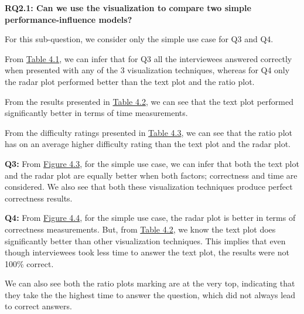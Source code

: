 \vskip 0.2in
\begin{mdframed}
\textbf{RQ2.1: Can we use the visualization to compare two simple performance-influence models?}
\end{mdframed}

For this sub-question, we consider only the simple use case for Q3 and Q4.

\begin{description}[leftmargin=0pt]
\item[Correctness: ] From \hyperref[table:correctness]{Table 4.1}, we can infer that for Q3 all the interviewees answered correctly when presented with any of the 3 visualization techniques, whereas for Q4 only the radar plot performed better than the text plot and the ratio plot.

\item[Time Measurements: ] From the results presented in \hyperref[table:time]{Table 4.2}, we can see that the text plot performed significantly better in terms of time measurements.

\item[Difficulty Ratings: ] From the difficulty ratings presented in \hyperref[table:rating]{Table 4.3}, we can see that the ratio plot has on an average higher difficulty rating than the text plot and the radar plot.

\end{description}


\textbf{Q3:} From \hyperref[figure:paretoTwoQ3]{Figure 4.3}, for the simple use case, we can infer that both the text plot and the radar plot are equally better when both factors; correctness and time are considered. We also see that both these visualization techniques produce perfect correctness results.

\textbf{Q4:} From \hyperref[figure:paretoTwoQ4]{Figure 4.4}, for the simple use case, the radar plot is better in terms of correctness measurements. But, from \hyperref[table:time]{Table 4.2}, we know the text plot does significantly better than other visualization techniques. This implies that even though interviewees took less time to answer the text plot, the results were not 100\% correct.

We can also see both the ratio plots marking are at the very top, indicating that they take the the highest time to answer the question, which did not always lead to correct answers.

